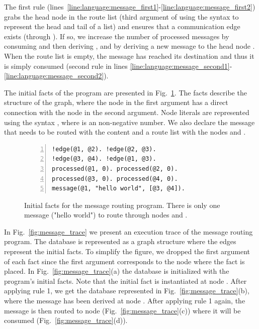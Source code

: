 The first rule
(lines~\ref{line:language:message_first1}-\ref{line:language:message_first2})
grabs the head node  in the route list (third argument of 
using the syntax \code{[B | L]} to represent the head and tail of a list) and
ensures that a communication edge exists (through ). If so, we
increase the number of processed messages by consuming 
and then deriving , and by deriving a new message to
the head node .  When the route list is empty, the message has reached
its destination and thus it is simply consumed (second rule in lines
\ref{line:language:message_second1}-\ref{line:language:message_second2}).

The initial facts of the program are presented in
Fig.~\ref{code:language:message_facts}. The  facts describe the
structure of the graph, where the node in the first argument has a direct
connection with the node in the second argument. Node literals are represented
using the syntax , where  is an non-negative number. We also
declare the message that needs to be routed with the content  and a route list with the nodes  and .

\begin{figure}[h!]
\begin{Verbatim}[numbers=left,commandchars=\*\{\},fontsize=\codesize]
!edge(@1, @2). !edge(@2, @3).
!edge(@3, @4). !edge(@1, @3).
processed(@1, 0). processed(@2, 0).
processed(@3, 0). processed(@4, 0).
message(@1, "hello world", [@3, @4]).
\end{Verbatim}
\caption{Initial facts for the message routing program. There is only one message ("hello
world") to route through nodes  and .}
\label{code:language:message_facts}
\end{figure}

In Fig.~\ref{fig:message_trace} we present an execution trace of the message
routing program. The database is represented as a graph structure where the
edges represent the  initial facts. To simplify the figure, we
dropped the first argument of each fact since the first argument corresponds to
the node where the fact is placed. In Fig.~\ref{fig:message_trace}(a) the
database is initialized with the program's initial facts. Note that the initial
 fact is instantiated at node . After applying rule 1, we
get the database represented in Fig.~\ref{fig:message_trace}(b), where the
message has been derived at node . After applying rule 1 again, the
message is then routed to node  (Fig.~\ref{fig:message_trace}(c))
where it will be consumed (Fig.~\ref{fig:message_trace}(d)).

